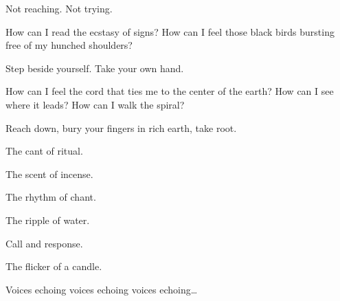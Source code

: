 \begin{paracol}{2}
\begin{leftcolumn}
\begin{ally}
Not reaching. Not trying.
\end{ally}
How can I read the ecstasy of signs? How can I feel those black birds bursting free of my hunched shoulders?

\begin{ally}
Step beside yourself. Take your own hand.
\end{ally}
How can I feel the cord that ties me to the center of the earth? How can I see where it leads? How can I walk the spiral?

\begin{ally}
Reach down, bury your fingers in rich earth, take root.
\end{ally}
The cant of ritual.

\begin{ally}
The scent of incense.
\end{ally}
The rhythm of chant.

\begin{ally}
The ripple of water.
\end{ally}
Call and response.

\begin{ally}
The flicker of a candle.
\end{ally}
Voices echoing voices echoing voices echoing\ldots{}


\end{leftcolumn}
\end{paracol}
